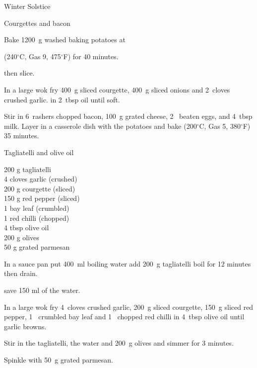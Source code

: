 \begin{menu}{Winter Solstice}
\begin{recipe}{2}{Courgettes and bacon}
\begin{ingredients}
		\end{ingredients}
	
    \begin{instructions}
    \item 
      Bake 1200~g washed baking potatoes
      at
      
      (240$^{\circ}$C, Gas 9, 475$^{\circ}$F)
     for 40 minutes.
    
        then slice.
      \item 
        In a large wok fry
        400~g sliced courgette,
        400~g sliced onions
        and
        2~cloves crushed garlic.
        in
        2~tbsp  oil
        until soft.
      \item 
        Stir in
        6~rashers chopped bacon,
        100~g grated cheese,
        2~ beaten eggs,
        and
        4~tbsp  milk.
        Layer in a casserole dish
        with the potatoes
        and bake 
      (200$^{\circ}$C, Gas 5, 380$^{\circ}$F)
     35 minutes.
      
    \end{instructions}
    \end{recipe}%
  
    \begin{recipe}{1}{Tagliatelli and olive oil}%
    
		\begin{ingredients}
		200 g tagliatelli  \\
	4 cloves garlic (crushed) \\
	200 g courgette (sliced) \\
	150 g red pepper (sliced) \\
	1  bay leaf (crumbled) \\
	1  red chilli (chopped) \\
	4 tbsp olive oil  \\
	200 g olives  \\
	50 g grated parmesan  \\
	
		\end{ingredients}
	
    \begin{instructions}
    \item 
      In a
      sauce pan
      put
      400~ml  boiling water
      add
      200~g  tagliatelli
      boil for 12 minutes then drain.
    
        save 150 ml of the water.
      \item 
        In a large wok fry
        4~cloves crushed garlic,
        200~g sliced courgette,
        150~g sliced red pepper,
        1~ crumbled bay leaf
        and
        1~ chopped red chilli
        in
        4~tbsp  olive oil
        until garlic browns.
      \item 
        Stir in the tagliatelli,
        the water
        and
        200~g  olives
        and simmer for 3 minutes.
      \item 
        Spinkle with
        50~g  grated parmesan.
      

\end{instructions}
\end{recipe}
\end{menu}
